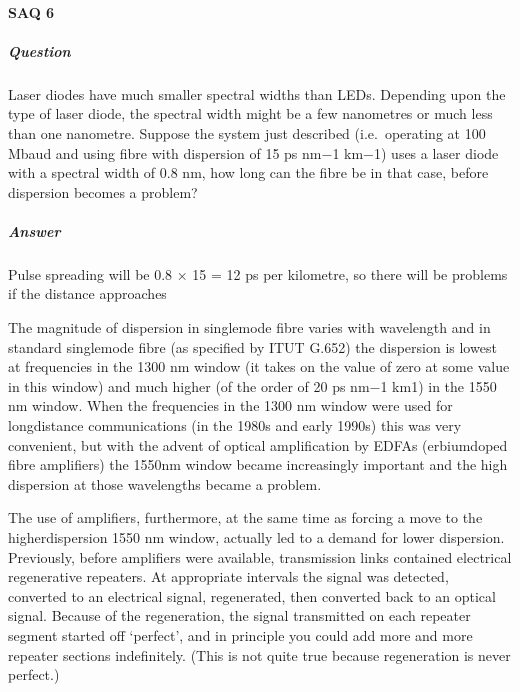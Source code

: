 \documentclass[letterpaper,10pt,english]{sphinxmanual}
\let\sphinxpxdimen\pdfpxdimen\else\newdimen\sphinxpxdimen
\begin{document}
\sphinxincludegraphics[width=511\sphinxpxdimen,height=100\sphinxpxdimen]{{t305_ue014i}.gif}


\paragraph{SAQ 6}
\label{\detokenize{content/session_00/Part_00_02:SAQ-6}}

\subparagraph{Question}
\label{\detokenize{content/session_00/Part_00_02:id19}}
Laser diodes have much smaller spectral widths than LEDs. Depending upon the type of laser diode, the spectral width might be a few nanometres or much less than one nanometre. Suppose the system just described (i.e. operating at 100 Mbaud and using fibre with dispersion of 15 ps nm−1 km−1) uses a laser diode with a spectral width of 0.8 nm, how long can the fibre be in that case, before dispersion becomes a problem?


\subparagraph{Answer}
\label{\detokenize{content/session_00/Part_00_02:id20}}
Pulse spreading will be 0.8 × 15 = 12 ps per kilometre, so there will be problems if the distance approaches

\sphinxincludegraphics[width=511\sphinxpxdimen,height=93\sphinxpxdimen]{{t305_ue026i}.gif} The magnitude of dispersion in single\sphinxhyphen{}mode fibre varies with wavelength and in standard single\sphinxhyphen{}mode fibre (as specified by ITU\sphinxhyphen{}T G.652) the dispersion is lowest at frequencies in the 1300 nm window (it takes on the value of zero at some value in this window) and much higher (of the order of 20 ps nm−1 km1) in the 1550 nm window. When the frequencies in the 1300 nm window were used for long\sphinxhyphen{}distance communications (in the 1980s and early 1990s) this was very
convenient, but with the advent of optical amplification by EDFAs (erbium\sphinxhyphen{}doped fibre amplifiers) the 1550nm window became increasingly important and the high dispersion at those wavelengths became a problem.

The use of amplifiers, furthermore, at the same time as forcing a move to the higher\sphinxhyphen{}dispersion 1550 nm window, actually led to a demand for lower dispersion. Previously, before amplifiers were available, transmission links contained electrical regenerative repeaters. At appropriate intervals the signal was detected, converted to an electrical signal, regenerated, then converted back to an optical signal. Because of the regeneration, the signal transmitted on each repeater segment started off
‘perfect’, and in principle you could add more and more repeater sections indefinitely. (This is not quite true because regeneration is never perfect.)
\end{document}
